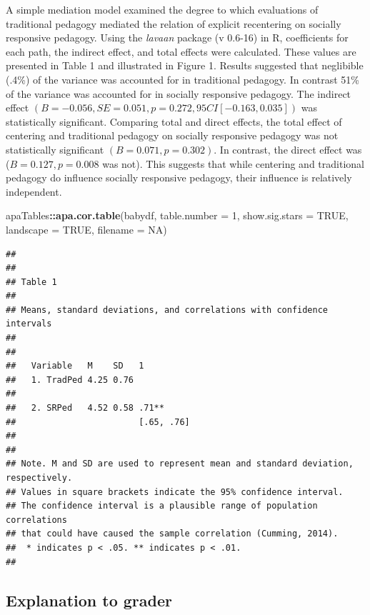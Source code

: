 \documentclass[
  11pt,
]{book}
\newenvironment{Shaded}{\begin{snugshade}}{\end{snugshade}}
\newcommand{\AttributeTok}[1]{\textcolor[rgb]{0.27,0.27,0.27}{#1}}
\newcommand{\ConstantTok}[1]{\textcolor[rgb]{0.37,0.37,0.37}{#1}}
\newcommand{\DecValTok}[1]{\textcolor[rgb]{0.06,0.06,0.06}{#1}}
\newcommand{\FunctionTok}[1]{\textcolor[rgb]{0.27,0.27,0.27}{\textbf{#1}}}
\newcommand{\NormalTok}[1]{#1}
\newcommand{\SpecialCharTok}[1]{\textcolor[rgb]{0.43,0.43,0.43}{\textbf{#1}}}
\begin{document}
A simple mediation model examined the degree to which evaluations of traditional pedagogy mediated the relation of explicit recentering on socially responsive pedagogy. Using the \emph{lavaan} package (v 0.6-16) in R, coefficients for each path, the indirect effect, and total effects were calculated. These values are presented in Table 1 and illustrated in Figure 1. Results suggested that neglibible (.4\%) of the variance was accounted for in traditional pedagogy. In contrast 51\% of the variance was accounted for in socially responsive pedagogy. The indirect effect \((B = -0.056, SE = 0.051, p = 0.272, 95CI[-0.163,0.035])\) was statistically significant. Comparing total and direct effects, the total effect of centering and traditional pedagogy on socially responsive pedagogy was not statistically significant \((B = 0.071, p = 0.302)\). In contrast, the direct effect was (\(B = 0.127, p = 0.008\) was not). This suggests that while centering and traditional pedagogy do influence socially responsive pedagogy, their influence is relatively independent.

\begin{Shaded}
\begin{Highlighting}[]
\NormalTok{apaTables}\SpecialCharTok{::}\FunctionTok{apa.cor.table}\NormalTok{(babydf, }\AttributeTok{table.number =} \DecValTok{1}\NormalTok{, }\AttributeTok{show.sig.stars =} \ConstantTok{TRUE}\NormalTok{,}
    \AttributeTok{landscape =} \ConstantTok{TRUE}\NormalTok{, }\AttributeTok{filename =} \ConstantTok{NA}\NormalTok{)}
\end{Highlighting}
\end{Shaded}

\begin{verbatim}
## 
## 
## Table 1 
## 
## Means, standard deviations, and correlations with confidence intervals
##  
## 
##   Variable   M    SD   1         
##   1. TradPed 4.25 0.76           
##                                  
##   2. SRPed   4.52 0.58 .71**     
##                        [.65, .76]
##                                  
## 
## Note. M and SD are used to represent mean and standard deviation, respectively.
## Values in square brackets indicate the 95% confidence interval.
## The confidence interval is a plausible range of population correlations 
## that could have caused the sample correlation (Cumming, 2014).
##  * indicates p < .05. ** indicates p < .01.
## 
\end{verbatim}

\hypertarget{explanation-to-grader}{%
\subsection*{Explanation to grader}\label{explanation-to-grader}}
\end{document}
